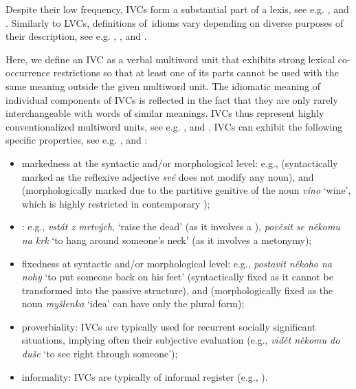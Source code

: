 \documentclass[output=paper,modfonts,nonflat]{langsci/langscibook}
\begin{document}
Despite their low frequency, IVCs form a substantial part of a lexis, see e.g. \citet{baldwin2010multiword}, \citet{Sag2002a} and \citet{cowie-01}.  Similarly to LVCs, 
definitions of~idioms vary depending on diverse purposes of their description, see e.g. \citet{healy-68}, \citet{fraser-70}, \citet{van1992incremental} and \citet{nunberg-94}.

Here, we define an IVC as a verbal multiword unit that exhibits strong lexical 
co-occurrence restrictions so that at least one of its parts cannot be used with 
the same meaning outside the given multiword unit. The idiomatic meaning of 
individual components of IVCs is reflected in the fact that they are only rarely 
interchangeable with words of similar meanings. 
IVCs thus represent highly conventionalized multiword units, see e.g. 
\citet{everaert-14}, \citet{granger-08} and \citet{cowie-01}. IVCs can 
exhibit the following specific properties, see e.g. \citet{burger-07}, 
\citet{cermak-01} and \citet{everaert-14}:

\begin{itemize}
\item
markedness at the syntactic and/or morphological level: e.g.,  (syntactically marked as the reflexive 
adjective \textit{své} does not modify any noun), and  
(morphologically marked due to the partitive genitive of the noun \textit{víno} 
`wine', which is highly restricted in contemporary );
 
\item
{}: e.g., \textit{vstát z mrtvých}, `raise the dead' (as it involves a 
), \textit{pověsit se někomu na krk} `to hang around someone's neck' 
(as it involves a metonymy);

\item
fixedness at syntactic and/or morphological level: e.g., 
\textit{postavit někoho na nohy} `to put someone back on his feet' 
(syntactically fixed as it cannot be transformed into the passive structure), 
and  (morphologically fixed as the noun \textit{myšlenka} 
`idea' can have only the plural form);

\item
proverbiality: IVCs are typically used for recurrent socially significant 
situations, implying often their subjective evaluation (e.g., \textit{vidět 
někomu do duše} `to see right through someone');

\item
informality: IVCs are typically of informal register (e.g., ).
\end{itemize}
\end{document}
